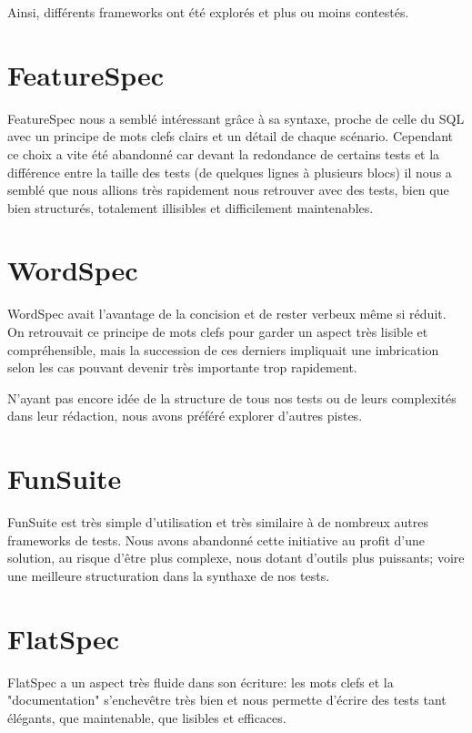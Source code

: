 \documentclass[a4paper, 12pt]{report}
\begin{document}
    Ainsi, différents frameworks ont été explorés et plus ou moins contestés.
    
    \section{FeatureSpec}
    
    FeatureSpec nous a semblé intéressant grâce à sa syntaxe, proche de celle du SQL avec un principe de mots clefs clairs et un détail de chaque scénario. Cependant ce choix a vite été abandonné car devant la redondance de certains tests et la différence entre la taille des tests (de quelques lignes à plusieurs blocs) il nous a semblé que nous allions très rapidement nous retrouver avec des tests, bien que bien structurés, totalement illisibles et difficilement maintenables.
    
    \section{WordSpec}
    
    WordSpec avait l'avantage de la concision et de rester verbeux même si réduit. On retrouvait ce principe de mots clefs pour garder un aspect très lisible et compréhensible, mais la succession de ces derniers impliquait une imbrication selon les cas pouvant devenir très importante trop rapidement.
    
    N'ayant pas encore idée de la structure de tous nos tests ou de leurs complexités dans leur rédaction, nous avons préféré explorer d'autres pistes.
    
    \section{FunSuite}
    
    FunSuite est très simple d'utilisation et très similaire à de nombreux autres frameworks de tests. Nous avons abandonné cette initiative au profit d'une solution, au risque d'être plus complexe, nous dotant d'outils plus puissants; voire une meilleure structuration dans la synthaxe de nos tests.
    
    \section{FlatSpec}
    
    FlatSpec a un aspect très fluide dans son écriture: les mots clefs et la "documentation" s'enchevêtre très bien et nous permette d'écrire des tests tant élégants, que maintenable, que lisibles et efficaces.
    
\end{document}
